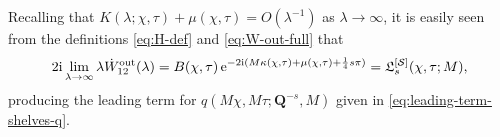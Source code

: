 Recalling that $K(\lambda;\chi,\tau) +\mu(\chi,\tau)= O(\lambda^{-1})$ as $\lambda\to\infty$, it is easily seen from the definitions \eqref{eq:H-def} and \eqref{eq:W-out-full} that
\begin{equation}
2\mathrm{i} \lim_{\lambda\to\infty} \lambda \dot{W}^{\mathrm{out}}_{12}(\lambda) 
=B(\chi,\tau) \,\mathrm{e}^{-2\mathrm{i} (M \kappa(\chi,\tau) +  \mu(\chi,\tau) + \frac{1}{4} s \pi)} = \mathfrak{L}_s^{[\mathcal{S}]}(\chi,\tau;M),
\label{eq:psi-k-bun-outer}
\end{equation}
producing the leading term for $q(M\chi,M\tau; \mathbf{Q}^{-s},M)$ given in \eqref{eq:leading-term-shelves-q}.

